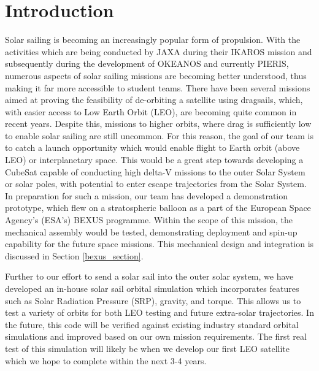 \documentclass[final,3p,times,twocolumn]{elsarticle}
\begin{document}
\def\arraystretch{1.0}

\section{Introduction}

\par\noindent Solar sailing is becoming an increasingly popular form of propulsion. With the activities which are being conducted by JAXA during their IKAROS mission and subsequently during the development of OKEANOS and currently PIERIS, numerous aspects of solar sailing missions are becoming better understood, thus making it far more accessible to student teams. There have been several missions aimed at proving the feasibility of de-orbiting a satellite using dragsails, which, with easier access to Low Earth Orbit (LEO), are becoming quite common in recent years. Despite this, missions to higher orbits, where drag is sufficiently low to enable solar sailing are still uncommon. For this reason, the goal of our team is to catch a launch opportunity which would enable flight to Earth orbit (above LEO) or interplanetary space. This would be a great step towards developing a CubeSat capable of conducting high delta-V missions to the outer Solar System or solar poles, with potential to enter escape trajectories from the Solar System. In preparation for such a mission, our team has developed a demonstration prototype, which flew on a stratospheric balloon as a part of the European Space Agency's (ESA's) BEXUS programme. Within the scope of this mission, the mechanical assembly would be tested, demonstrating deployment and spin-up capability for the future space missions. This mechanical design and integration is discussed in Section \ref{bexus_section}.
\vspace{5pt}
\par\noindent Further to our effort to send a solar sail into the outer solar system, we have developed an in-house solar sail orbital simulation which incorporates features such as Solar Radiation Pressure (SRP), gravity, and torque. This allows us to test a variety of orbits for both LEO testing and future extra-solar trajectories. In the future, this code will be verified against existing industry standard orbital simulations and improved based on our own mission requirements. The first real test of this simulation will likely be when we develop our first LEO satellite which we hope to complete within the next 3-4 years.
\end{document}
